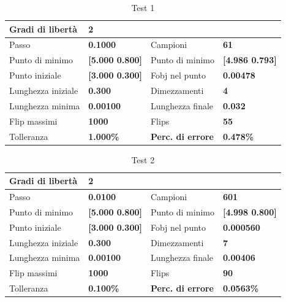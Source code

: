 \documentclass[a4paper, 11pt]{article}
\begin{document}
\begin{table}[h]
	\caption{Test 1}
	\begin{center}
	\begin{tabular}{|l|l|l|l|} 
	\hline 
	Gradi di libertà & \textbf{2} &  &  \\ \hline 
	Passo & \textbf{0.1000} & Campioni & \textbf{61} \\ \hline 
	Punto di minimo & \textbf{{[}5.000 0.800{]}} & Punto di minimo & \textbf{{[}4.986 0.793{]}} \\ \hline 
	Punto iniziale & \textbf{{[}3.000 0.300{]}} & Fobj nel punto & \textbf{0.00478} \\ \hline 
	Lunghezza iniziale & \textbf{0.300} & Dimezzamenti & \textbf{4} \\ \hline 
	Lunghezza minima & \textbf{0.00100} & Lunghezza finale & \textbf{0.032} \\ \hline
	Flip massimi & \textbf{1000} & Flips & \textbf{55} \\ \hline 
	Tolleranza & \textbf{1.000\%} & \textbf{Perc. di errore} & \textbf{0.478\%} \\ \hline 
	\end{tabular}
	\end{center}
	\end{table}

\begin{table}[h]
	\caption{Test 2}
	\begin{center}
	\begin{tabular}{|l|l|l|l|} 
	\hline 
	Gradi di libertà & \textbf{2} &  &  \\ \hline 
	Passo & \textbf{0.0100} & Campioni & \textbf{601} \\ \hline 
	Punto di minimo & \textbf{{[}5.000 0.800{]}} & Punto di minimo & \textbf{{[}4.998 0.800{]}} \\ \hline 
	Punto iniziale & \textbf{{[}3.000 0.300{]}} & Fobj nel punto & \textbf{0.000560} \\ \hline 
	Lunghezza iniziale & \textbf{0.300} & Dimezzamenti & \textbf{7} \\ \hline 
	Lunghezza minima & \textbf{0.00100} & Lunghezza finale & \textbf{0.00406} \\ \hline
	Flip massimi & \textbf{1000} & Flips & \textbf{90} \\ \hline 
	Tolleranza & \textbf{0.100\%} & \textbf{Perc. di errore} & \textbf{0.0563\%} \\ \hline 
	\end{tabular} 
	\end{center}
	\end{table}
\end{document}
